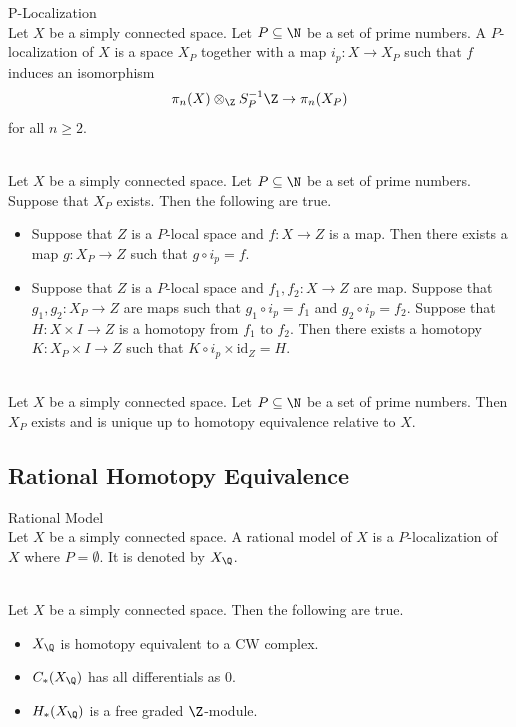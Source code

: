 \documentclass[a4paper]{article}
\begin{document}
\begin{defn}{P-Localization}{}\\
Let $X$ be a simply connected space. Let $P\subseteq\N$ be a set of prime numbers. A $P$-localization of $X$ is a space $X_P$ together with a map $i_p:X\to X_P$ such that $f$ induces an isomorphism $$\pi_n(X)\otimes_\Z S_P^{-1}\Z\to\pi_n(X_P)$$ for all $n\geq 2$. 
\end{defn}

\begin{prp}{}{}\\
Let $X$ be a simply connected space. Let $P\subseteq\N$ be a set of prime numbers. Suppose that $X_P$ exists. Then the following are true. 
\begin{itemize}
\item Suppose that $Z$ is a $P$-local space and $f:X\to Z$ is a map. Then there exists a map $g:X_P\to Z$ such that $g\circ i_p=f$. 
\item Suppose that $Z$ is a $P$-local space and $f_1,f_2:X\to Z$ are map. Suppose that $g_1,g_2:X_P\to Z$ are maps such that $g_1\circ i_p=f_1$ and $g_2\circ i_p=f_2$. Suppose that $H:X\times I\to Z$ is a homotopy from $f_1$ to $f_2$. Then there exists a homotopy $K:X_P\times I\to Z$ such that $K\circ i_p\times\text{id}_Z=H$. 
\end{itemize}
\end{prp}

\begin{prp}{}{}\\
Let $X$ be a simply connected space. Let $P\subseteq\N$ be a set of prime numbers. Then $X_P$ exists and is unique up to homotopy equivalence relative to $X$. 
\end{prp}

\subsection{Rational Homotopy Equivalence}
\begin{defn}{Rational Model}{}\\
Let $X$ be a simply connected space. A rational model of $X$ is a $P$-localization of $X$ where $P=\emptyset$. It is denoted by $X_\Q$. 
\end{defn}

\begin{prp}{}{}\\
Let $X$ be a simply connected space. Then the following are true. 
\begin{itemize}
\item $X_\Q$ is homotopy equivalent to a CW complex. 
\item $C_\ast(X_\Q)$ has all differentials as $0$. 
\item $H_\ast(X_\Q)$ is a free graded $\Z$-module. 
\end{itemize}
\end{prp}
\end{document}
